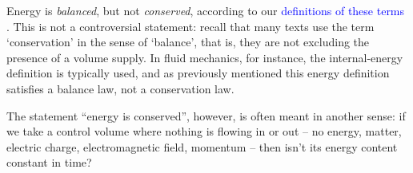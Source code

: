 \documentclass[a4paper,12pt,%
onecolumn,oneside,%
british%
]{memoir}
\renewcommand*{\|}[1][]{\nonscript\:#1\vert\nonscript\:\mathopen{}}
\newcommand*{\sect}{\S}%
\newcommand*{\eqn}{eq.}%
\renewcommand*{\autoref}[3][\sect\,\ref]{\textcolor{blue}{#3}
\raisebox{0.6ex}{\color{blue}\miniscule%
\faIcon{angle-right}%
\;#1{#2}\;p.\,\pageref{#2}}}
\begin{document}
Energy is \emph{balanced}, but not \emph{conserved}, according to our \autoref{wa:conservation}{definitions of these terms}. This is not a controversial statement: recall that many texts use the term \enquote*{conservation} in the sense of \enquote*{balance}, that is, they are not excluding the presence of a volume supply.
%
%
In fluid mechanics, for instance, the internal-energy definition is typically used, and as previously mentioned this energy definition satisfies a balance law, not a conservation law.

The statement \enquote{energy is conserved}, however, is often meant in another sense: if we take a control volume where nothing is flowing in or out -- no energy, matter, electric charge, electromagnetic field, momentum -- then isn't its energy content constant in time?
\end{document}
